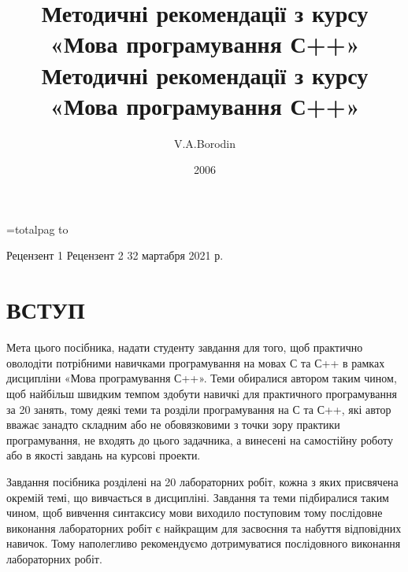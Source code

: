 \documentclass[a5paper,titlepage,openany,twoside,draft]{book_unv}%
\date{}
\begin{document}
\titlepage
\author{V.A.Borodin}
\title{Методичні рекомендації з курсу «Мова програмування С++» }
\date{2006}
\maketitle


=totalpag
 to \totalpag
{}
\title{Методичні рекомендації з курсу «Мова програмування С++» }%
\secondpage%
{\totalpag}
{Рецензент 1}%
{Рецензент 2}%
{32 мартабря 2021 р.}%
\setcounter{page}{2}
\tableofcontents


\chapter*{ ВСТУП }

Мета цього посібника, надати студенту завдання для того, щоб практично
оволодіти потрібними навичками програмування на мовах С та С++ в рамках
дисципліни «Мова програмування С++». Теми обиралися автором таким чином,
щоб найбільш швидким темпом здобути навичкі для практичного
програмування за 20 занять, тому деякі теми та розділи програмування на
С та С++, які автор вважає занадто складним або не обовязковими з точки
зору практики програмування, не входять до цього задачника, а винесені
на самостійну роботу або в якості завдань на курсові проекти.

Завдання посібника розділені на 20 лабораторних робіт, кожна з яких
присвячена окремій темі, що вивчається в дисципліні. Завдання та теми
підбиралися таким чином, щоб вивчення синтаксису мови виходило
поступовим тому послідовне виконання лабораторних робіт є найкращим для
засвоєння та набуття відповідних навичок. Тому наполегливо рекомендуємо
дотримуватися послідовного виконання лабораторних робіт.
\end{document}
